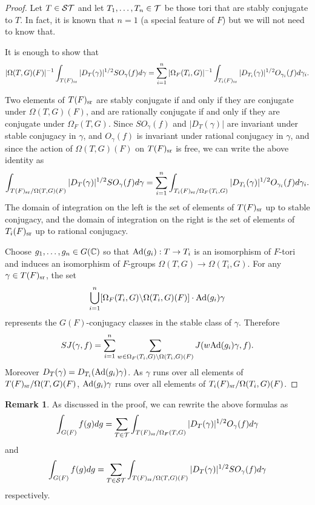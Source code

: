 \documentclass{article}
\theoremstyle{definition}
\newtheorem{rem}[thm]{Remark}
\numberwithin{equation}{section}
\renewcommand{\-}{\hyp{}}
\begin{document}
\begin{proof}
	Let $T \in \mathcal{ST}$ and let $T_1,\dots,T_n \in \mathcal{T}$ be those tori that  are stably conjugate to $T$. In fact, it is known that $n=1$ (a special feature of $F$) but we will not need to know that.
	
	It is enough to show that 
	\[ |\Omega(T,G)(F)|^{-1}\int_{T(F)_{\textrm{sr}}} |D_T(\gamma)|^{1/2}SO_\gamma(f)d\gamma = \sum_{i=1}^n|\Omega_F(T_i,G)|^{-1}\int_{T_i(F)_{\textrm{sr}}} |D_{T_i}(\gamma)|^{1/2}O_{\gamma_i}(f)d\gamma_i. \]
	
	Two elements of $T(F)_{\textrm{sr}}$ are stably conjugate if and only if they are conjugate under $\Omega(T,G)(F)$, and are rationally conjugate if and only if they are conjugate under $\Omega_F(T,G)$. Since $SO_\gamma(f)$ and $|D_T(\gamma)|$ are invariant under stable conjugacy in $\gamma$, and $O_\gamma(f)$ is invariant under rational conjugacy in $\gamma$, and since the action of $\Omega(T,G)(F)$ on $T(F)_{\textrm{sr}}$ is free,  we can write the above identity as 
	\[ \int_{T(F)_{\textrm{sr}}/\Omega(T,G)(F)} |D_{T}(\gamma)|^{1/2} SO_\gamma(f)d\gamma = \sum_{i=1}^n\int_{T_i(F)_{\textrm{sr}}/\Omega_F(T_i,G)} |D_{T_i}(\gamma)|^{1/2}O_{\gamma_i}(f)d\gamma_i. \]
	The domain of integration on the left is the set of elements of $T(F)_{\textrm{sr}}$ up to stable conjugacy, and the domain of integration on the right is the set of elements of $T_i(F)_{\textrm{sr}}$ up to rational conjugacy.

	Choose $g_1,\dots,g_n \in G(\mathbb{C})$ so that $\textrm{Ad}(g_i) : T \to T_i$ is an isomorphism of $F$-tori and induces an isomorphism of $F$-groups $\Omega(T,G) \to \Omega(T_i,G)$. For any $\gamma \in T(F)_{\textrm{sr}}$, the set 
	\[ \bigcup_{i=1}^n [\Omega_F(T_i,G) \backslash \Omega(T_i,G)(F)] \cdot \textrm{Ad}(g_i)\gamma \]
	represents the $G(F)$-conjugacy classes in the stable class of $\gamma$. Therefore 
	\[ SJ(\gamma,f) = \sum_{i=1}^n \sum_{w \in \Omega_F(T_i,G) \backslash \Omega(T_i,G)(F)} J(w\textrm{Ad}(g_i)\gamma,f).\]
	Moreover $D_T(\gamma)=D_{T_i}(\textrm{Ad}(g_i)\gamma)$.
	As $\gamma$ runs over all elements of $T(F)_{\textrm{sr}}/\Omega(T,G)(F)$, $\textrm{Ad}(g_i)\gamma$ runs over all elements of $T_i(F)_{\textrm{sr}}/\Omega(T_i,G)(F)$.
\end{proof}

\begin{rem} \label{rem:weyl1}
	As discussed in the proof, we can rewrite the above formulas as
	\[ \int_{G(F)}f(g)dg = \sum_{T \in \mathcal{T}}\int_{T(F)_{\textrm{sr}}/\Omega_F(T,G)} |D_T(\gamma)|^{1/2} O_\gamma(f)d\gamma \]
	and
	\[ \int_{G(F)}f(g)dg = \sum_{T \in \mathcal{ST}}\int_{T(F)_{\textrm{sr}}/\Omega(T,G)(F)} |D_T(\gamma)|^{1/2} SO_\gamma(f)d\gamma \]
	respectively.
\end{rem}
\end{document}

